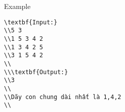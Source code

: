 Example
\begin{verbatim}
\textbf{Input:}
\\5 3
\\1 5 3 4 2
\\1 3 4 2 5
\\3 1 5 4 2
\\
\\\textbf{Output:}
\\3
\\
\\Dãy con chung dài nhất là 1,4,2
\\\end{verbatim}